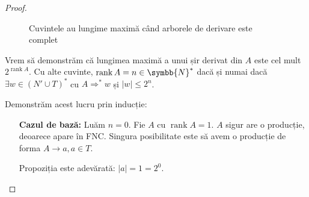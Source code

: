 \documentclass{article}
\newcommand{\abs}[1]{\left\lvert #1 \right\rvert}
\newcommand{\naturals}{\symbb{N}}
\DeclareMathOperator{\rank}{rank}
\begin{document}
\begin{enumerate}
\begin{proof}
\begin{itemize}
        \begin{figure}[!hb]
            \centering
            \caption*{Cuvintele au lungime maximă când arborele de derivare este complet}
        \end{figure}
    
        Vrem să demonstrăm că lungimea maximă a unui șir derivat din \(A\) este cel mult \(2^{\rank A}\).
        Cu alte cuvinte, \(\rank A = n \in \naturals^*\) dacă și numai dacă \(\exists w \in (N' \cup T)^*\) cu \(A \Rightarrow^* w\) și \(\abs{w} \leq 2^n\).
        
        Demonstrăm acest lucru prin inducție:
        \begin{itemize}
            \item[\textbf{Cazul de bază:}] Luăm \(n = 0\). Fie \(A\) cu \(\rank A = 1\). \(A\) sigur are o producție, deoarece apare în FNC. Singura posibilitate este să avem o producție de forma \(A \to a, a \in T\).
            
            Propoziția este adevărată: \(\abs{a} = 1 = 2^0\).
            

\end{itemize}
\end{itemize}
\end{proof}
\end{enumerate}
\end{document}
